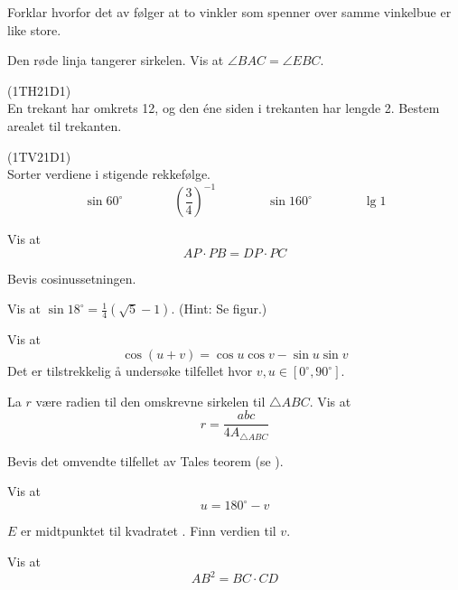 Forklar hvorfor det av  følger at to vinkler som spenner over samme vinkelbue er like store.

 \vs
{}

\newpage
{}
Den røde linja tangerer sirkelen. Vis at $ \angle BAC=\angle EBC $.

\newpage
{} 
(1TH21D1) \\
En trekant har omkrets 12, og den éne siden i trekanten har lengde 2. Bestem arealet til trekanten.


(1TV21D1)\\
Sorter verdiene i stigende rekkefølge.
\[ \sin 60^\circ\qquad\qquad \left(\frac{3}{4}\right)^{-1}\qquad\qquad\sin 160^\circ\qquad\qquad \lg 1\]

Vis at 
\[ AP\cdot PB = DP\cdot PC \]

Bevis cosinussetningen.

Vis at $ \sin 18^\circ=\frac{1}{4}(\sqrt{5}-1) $. (Hint: Se figur.)

\newpage
{}
Vis at
\[ \cos(u+v)= \cos u\cos v-\sin u \sin v \]
Det er tilstrekkelig å undersøke tilfellet hvor $ v,u \in [0^\circ, 90^\circ] $.


La $ r $ være radien til den omskrevne sirkelen til $ \triangle ABC $. Vis at
\[ r=\frac{abc}{4A_{\triangle ABC}} \]

Bevis det omvendte tilfellet av Tales teorem (se  ).


Vis at
\[ u=180^\circ-v \]

\newpage
{}
$ E $ er midtpunktet til kvadratet . Finn verdien til $ v $.


Vis at
\[ AB^2 = BC\cdot CD \]






